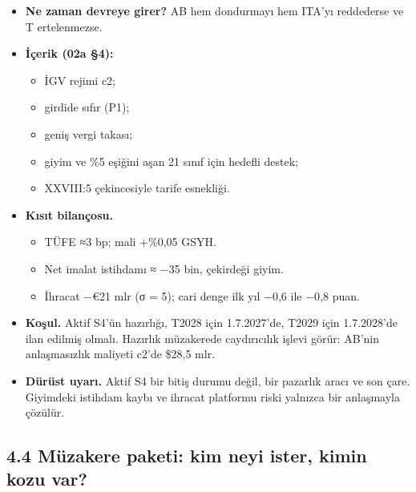 \begin{itemize}
\tightlist
\item
  \textbf{Ne zaman devreye girer?} AB hem dondurmayı hem ITA'yı reddederse ve T ertelenmezse.
\item
  \textbf{İçerik (02a §4):}

  \begin{itemize}
  \tightlist
  \item
    İGV rejimi c2;
  \item
    girdide sıfır (P1);
  \item
    geniş vergi takası;
  \item
    giyim ve \%5 eşiğini aşan 21 sınıf için hedefli destek;
  \item
    XXVIII:5 çekincesiyle tarife esnekliği.
  \end{itemize}
\item
  \textbf{Kısıt bilançosu.}

  \begin{itemize}
  \tightlist
  \item
    TÜFE ≈3 bp; mali +\%0,05 GSYH.
  \item
    Net imalat istihdamı ≈ −35 bin, çekirdeği giyim.
  \item
    İhracat −€21 mlr (σ = 5); cari denge ilk yıl −0,6 ile −0,8 puan.
  \end{itemize}
\item
  \textbf{Koşul.} Aktif S4'ün hazırlığı, T2028 için 1.7.2027'de, T2029 için 1.7.2028'de ilan edilmiş olmalı. Hazırlık müzakerede caydırıcılık işlevi görür: AB'nin anlaşmasızlık maliyeti c2'de \$28,5 mlr.
\item
  \textbf{Dürüst uyarı.} Aktif S4 bir bitiş durumu değil, bir pazarlık aracı ve son çare. Giyimdeki istihdam kaybı ve ihracat platformu riski yalnızca bir anlaşmayla çözülür.
\end{itemize}

\hypertarget{02b_secenekler_hukuk-44-muxfczakere-paketi-kim-neyi-ister-kimin-kozu-var}{%
\subsection{4.4 Müzakere paketi: kim neyi ister, kimin kozu var?}\label{02b_secenekler_hukuk-44-muxfczakere-paketi-kim-neyi-ister-kimin-kozu-var}}

\begingroup\gbtablo\small

